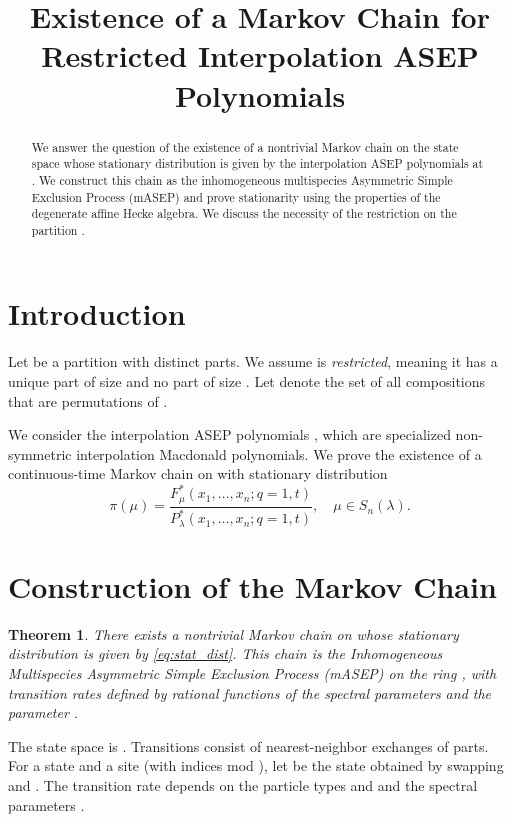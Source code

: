 \documentclass[12pt]{article}
\newtheorem{theorem}{Theorem}
\begin{document}
\title{Existence of a Markov Chain for Restricted Interpolation ASEP Polynomials}
\author{}
\date{}
\maketitle

\begin{abstract}
We answer the question of the existence of a nontrivial Markov chain on the state space  whose stationary distribution is given by the interpolation ASEP polynomials  at . We construct this chain as the inhomogeneous multispecies Asymmetric Simple Exclusion Process (mASEP) and prove stationarity using the properties of the degenerate affine Hecke algebra. We discuss the necessity of the restriction on the partition .
\end{abstract}

\section{Introduction}

Let  be a partition with distinct parts. We assume  is \textit{restricted}, meaning it has a unique part of size  and no part of size . Let  denote the set of all compositions  that are permutations of .

We consider the interpolation ASEP polynomials , which are specialized non-symmetric interpolation Macdonald polynomials. We prove the existence of a continuous-time Markov chain on  with stationary distribution
\begin{equation} \label{eq:stat_dist}
\pi(\mu) = \frac{F^*_{\mu}(x_1,\dots,x_n; q=1,t)}{P^*_{\lambda}(x_1,\dots,x_n; q=1,t)}, \quad \mu \in S_n(\lambda).
\end{equation}

\section{Construction of the Markov Chain}

\begin{theorem}
There exists a nontrivial Markov chain on  whose stationary distribution is given by \eqref{eq:stat_dist}. This chain is the Inhomogeneous Multispecies Asymmetric Simple Exclusion Process (mASEP) on the ring , with transition rates defined by rational functions of the spectral parameters  and the parameter .
\end{theorem}

The state space is . Transitions consist of nearest-neighbor exchanges of parts. For a state  and a site  (with indices mod ), let  be the state obtained by swapping  and . The transition rate  depends on the particle types  and  and the spectral parameters .
\end{document}
